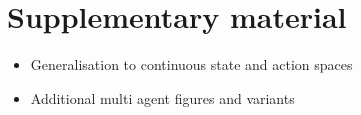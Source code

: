 \documentclass{article}
\begin{document}





\section*{Supplementary material}
\begin{itemize}
	\item Generalisation to continuous state and action spaces
	\item Additional multi agent figures and variants
\end{itemize}
\end{document}
